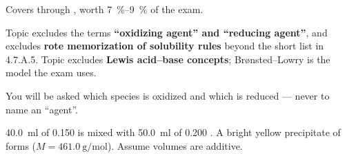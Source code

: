 \documentclass{apchem-exam}
\begin{document}
\apctitleblock

\begin{apcnote}
Covers  through , worth
\SI{7}{\percent}--\SI{9}{\percent} of the exam.

Topic  excludes the terms \textbf{``oxidizing agent'' and
``reducing agent''}, and excludes \textbf{rote memorization of solubility
rules} beyond the short list in 4.7.A.5. Topic  excludes
\textbf{Lewis acid--base concepts}; Br\o{}nsted--Lowry is the model the
exam uses.

You will be asked which species is oxidized and which is reduced --- never
to name an ``agent''.
\end{apcnote}



\SI{40.0}{\milli\litre} of \SI{0.150}{\Molar}  is mixed with
\SI{50.0}{\milli\litre} of \SI{0.200}{\Molar} . A bright yellow
precipitate of  forms ($M = \SI{461.0}{\gram\per\mole}$). Assume
volumes are additive.
\end{document}
